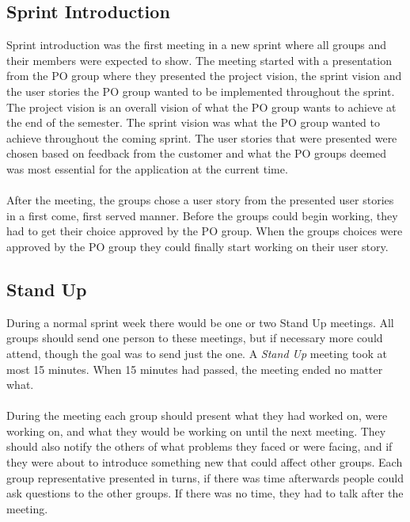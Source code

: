 \subsection{Sprint Introduction} \label{subsec:sprint-introduction}
Sprint introduction was the first meeting in a new sprint where all groups and their members were expected to show. 
The meeting started with a presentation from the PO group where they presented the project vision, the sprint vision and the user stories the PO group wanted to be implemented throughout the sprint.
The project vision is an overall vision of what the PO group wants to achieve at the end of the semester.
The sprint vision was what the PO group wanted to achieve throughout the coming sprint.
The user stories that were presented were chosen based on feedback from the customer and what the PO groups deemed was most essential for the application at the current time.
\\
\\
After the meeting, the groups chose a user story from the presented user stories in a first come, first served manner.
Before the groups could begin working, they had to get their choice approved by the PO group.
When the groups  choices were approved by the PO group they could finally start working on their user story.

\subsection{Stand Up}
During a normal sprint week there would be one or two Stand Up meetings.
All groups should send one person to these meetings, but if necessary more could attend, though the goal was to send just the one.
A \textit{Stand Up} meeting took at most 15 minutes.
When 15 minutes had passed, the meeting ended no matter what.
\\
\\
During the meeting each group should present what they had worked on, were working on, and what they would be working on until the next meeting.
They should also notify the others of what problems they faced or were facing, and if they were about to introduce something new that could affect other groups.
Each group representative presented in turns, if there was time afterwards people could ask questions to the other groups.
If there was no time, they had to talk after the meeting.


